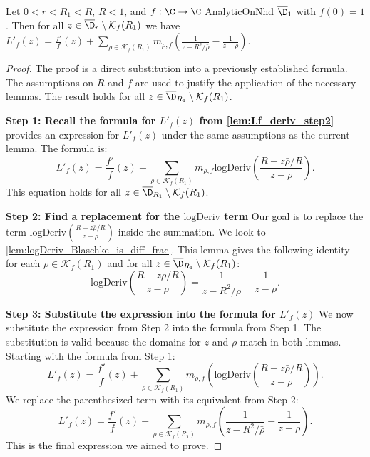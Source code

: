 \begin{lemma}\label{lem:Lf_deriv_step3} 
\leanok
Let $0<r<R_1<R$, $R < 1$, and $f:\C\to\C$ AnalyticOnNhd $\overline{\D}_1$ with $f(0)=1$. Then for all $z\in \overline{\D}_{r}\setminus\mathcal K_f(R_1)$ we have $L'_f(z)=\frac{f'}{f}(z) + \sum_{\rho\in\mathcal K_f(R_1)}m_{\rho,f}\left( \frac{1}{z-R^2/\bar\rho} - \frac{1}{z-\rho}\right)$.
\end{lemma}
\begin{proof}
\leanok
{}
The proof is a direct substitution into a previously established formula. The assumptions on $R$ and $f$ are used to justify the application of the necessary lemmas. The result holds for all $z \in \overline{\D}_{R_1} \setminus \mathcal{K}_f(R_1)$.

\textbf{Step 1: Recall the formula for $L'_f(z)$ from \cref{lem:Lf_deriv_step2}}
 provides an expression for $L'_f(z)$ under the same assumptions as the current lemma. The formula is:
\[ L'_f(z)=\frac{f'}{f}(z) + \sum_{\rho\in\mathcal K_f(R_1)}m_{\rho,f} \text{logDeriv}\left(\frac{R-z\bar\rho/R}{z-\rho}\right). \]
This equation holds for all $z \in \overline{\D}_{R_1} \setminus \mathcal{K}_f(R_1)$.

\textbf{Step 2: Find a replacement for the $\text{logDeriv}$ term}
Our goal is to replace the term $\text{logDeriv}\left(\frac{R-z\bar\rho/R}{z-\rho}\right)$ inside the summation. We look to \cref{lem:logDeriv_Blaschke_is_diff_frac}. This lemma gives the following identity for each $\rho \in \mathcal{K}_f(R_1)$ and for all $z \in \overline{\D}_{R_1} \setminus \mathcal{K}_f(R_1)$:
\[ \text{logDeriv}\left(\frac{R-z\bar\rho/R}{z-\rho}\right) = \frac{1}{z-R^2/\bar\rho} - \frac{1}{z-\rho}. \]

\textbf{Step 3: Substitute the expression into the formula for $L'_f(z)$}
We now substitute the expression from Step 2 into the formula from Step 1. The substitution is valid because the domains for $z$ and $\rho$ match in both lemmas.
Starting with the formula from Step 1:
\[ L'_f(z)=\frac{f'}{f}(z) + \sum_{\rho\in\mathcal K_f(R_1)}m_{\rho,f} \left( \text{logDeriv}\left(\frac{R-z\bar\rho/R}{z-\rho}\right) \right). \]
We replace the parenthesized term with its equivalent from Step 2:
\[ L'_f(z)=\frac{f'}{f}(z) + \sum_{\rho\in\mathcal K_f(R_1)}m_{\rho,f}\left( \frac{1}{z-R^2/\bar\rho} - \frac{1}{z-\rho}\right). \]
This is the final expression we aimed to prove.
\end{proof}

